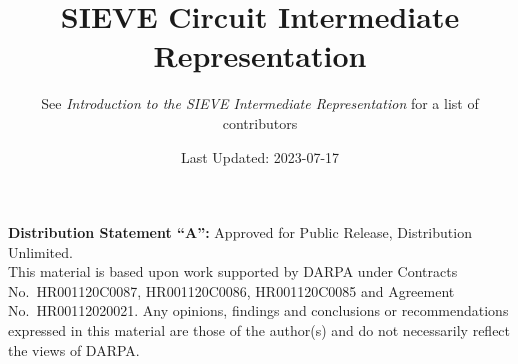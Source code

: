\documentclass[12pt]{article}
\title{SIEVE Circuit Intermediate Representation}
\author{See \textit{Introduction to the SIEVE Intermediate Representation} for a list of contributors}
\date{Last Updated: 2023-07-17}
\begin{document}
\maketitle

\textbf{Distribution Statement ``A'':} Approved for Public Release, Distribution Unlimited.\\

This material is based upon work supported by DARPA under Contracts No.~HR001120C0087, HR001120C0086, HR001120C0085 and Agreement No.~HR00112020021.  Any opinions, findings and conclusions or recommendations expressed in this material are those of the author(s) and do not necessarily reflect the views of DARPA.\\

\newpage
\tableofcontents
\newpage







\end{document}
